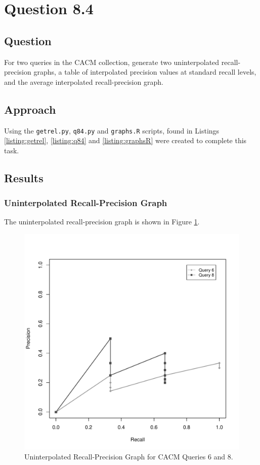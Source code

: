 \section{Question 8.4}


\subsection{Question}
For two queries in the CACM collection, generate two uninterpolated recall-precision graphs, a table of interpolated precision values at standard recall levels, and the average interpolated recall-precision graph.


\subsection{Approach}
Using the \texttt{getrel.py}, \texttt{q84.py} and \texttt{graphs.R} scripts, found in Listings \ref{listing:getrel}, \ref{listing:q84} and \ref{listing:graphsR} were created to complete this task.


\subsection{Results}


\subsubsection{Uninterpolated Recall-Precision Graph}
The uninterpolated recall-precision graph is shown in Figure \ref{fig:urpgraph68}.

\begin{figure}[H]
\centering
\label{fig:urpgraph68}
\includegraphics[scale=.6]{code/getrel/urpg68.pdf}
\caption{Uninterpolated Recall-Precision Graph for CACM Queries 6 and 8.}
\end{figure}


